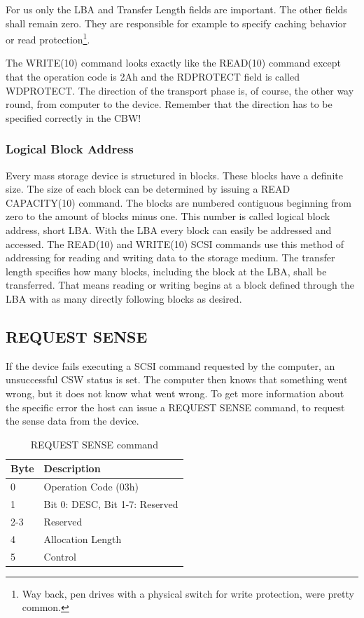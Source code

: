 For us only the LBA and Transfer Length fields are important. The other fields shall remain zero. They are responsible for example to specify caching behavior or read protection\footnote{Way back, pen drives with a physical switch for write protection, were pretty common.}.

The WRITE(10) command looks exactly like the READ(10) command except that the operation code is 2Ah and the RDPROTECT field is called WDPROTECT. The direction of the transport phase is, of course, the other way round, from computer to the device. Remember that the direction has to be specified correctly in the CBW!

\subsubsection{Logical Block Address}

Every mass storage device is structured in blocks. These blocks have a definite size. The size of each block can be determined by issuing a READ CAPACITY(10) command. The blocks are numbered contiguous beginning from zero to the amount of blocks minus one. This number is called logical block address, short LBA. With the LBA every block can easily be addressed and accessed. The READ(10) and WRITE(10) SCSI commands use this method of addressing for reading and writing data to the storage medium. The transfer length specifies how many blocks, including the block at the LBA, shall be transferred. That means reading or writing begins at a block defined through the LBA with as many directly following blocks as desired.

\subsection{REQUEST SENSE}

If the device fails executing a SCSI command requested by the computer, an unsuccessful CSW status is set. The computer then knows that something went wrong, but it does not know what went wrong. To get more information about the specific error the host can issue a REQUEST SENSE command, to request the sense data from the device.

\begin{table}[ht]
\caption{REQUEST SENSE command \cite{scsi_seagate}}
\centering
\begin{tabular}{|l|l|}
\hline\hline
\textbf{Byte} & \textbf{Description}\\ \hline
0 & Operation Code (03h)\\ \hline
1 & Bit 0: DESC, Bit 1-7: Reserved \\ \hline
2-3 & Reserved \\ \hline
4 & Allocation Length \\ \hline
5 & Control \\ \hline
\end{tabular}
\label{table:request_sense}
\end{table}

